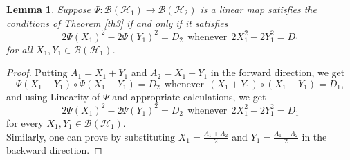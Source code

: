 \documentclass[10pt,a4paper]{amsart}
\newtheorem{lemma}{Lemma}
\begin{document}
\begin{lemma}
	\label{lem2}
	Suppose $\Psi: \mathscr{B}(\mathscr{H}_1) \to \mathscr{B}(\mathscr{H}_2)$ is a linear map satisfies the conditions of Theorem \ref{th3} if and only if it satisfies
    \begin{equation}
        \label{eq2}
        2 \Psi(X_1)^2-2\Psi(Y_1)^2=D_2~~\text{whenever}~~2X_1^2-2Y_1^2=D_1
    \end{equation}
    for all $X_1, Y_1 \in \mathscr{B}(\mathscr{H}_1)$.
\end{lemma}

\begin{proof}
	Putting $A_1=X_1+Y_1$ and $A_2=X_1-Y_1$ in the forward direction, we get
	$$\Psi(X_1+Y_1) \circ \Psi(X_1-Y_1)=D_2 ~~\text{whenever}~~ (X_1+Y_1) \circ (X_1-Y_1)=D_1,$$ and using Linearity of $\Psi$ and appropriate calculations, we get $$ 2 \Psi(X_1)^2-2\Psi(Y_1)^2=D_2 ~~\text{whenever}~~2X_1^2-2Y_1^2=D_1$$ for every $X_1, Y_1 \in \mathscr{B}(\mathscr{H}_1)$.\\
    Similarly, one can prove by substituting $X_1=\frac{A_1+A_2}{2}$ and $Y_1=\frac{A_1-A_2}{2}$ in the backward direction.
\end{proof}
\end{document}

